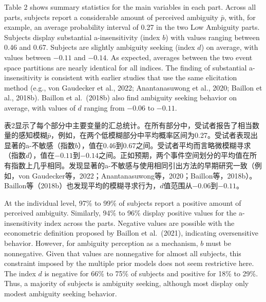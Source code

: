 \documentclass[12pt,a4paper]{article}
\newenvironment{original}
  {\par\medskip\noindent\color{black}\ignorespaces}
  {\par\medskip}
\newenvironment{translation}
  {\par\noindent\color{transblue}\ignorespaces}
  {\par\medskip\medskip}
\begin{document}
\begin{original}
Table 2 shows summary statistics for the main variables in each part. Across all parts, subjects report a considerable amount of perceived ambiguity $\bar{p}$, with, for example, an average probability interval of 0.27 in the two Low Ambiguity parts. Subjects display substantial a-insensitivity (index $b$) with values ranging between 0.46 and 0.67. Subjects are slightly ambiguity seeking (index $d$) on average, with values between $-0.11$ and $-0.14$. As expected, averages between the two event space partitions are nearly identical for all indices. The finding of substantial a-insensitivity is consistent with earlier studies that use the same elicitation method (e.g., von Gaudecker et al., 2022; Anantanasuwong et al., 2020; Baillon et al., 2018b). Baillon et al.\ (2018b) also find ambiguity seeking behavior on average, with values of $d$ ranging from $-0.06$ to $-0.11$.
\end{original}

\begin{translation}
表2显示了每个部分中主要变量的汇总统计。在所有部分中，受试者报告了相当数量的感知模糊$\bar{p}$，例如，在两个低模糊部分中平均概率区间为0.27。受试者表现出显著的a-不敏感（指数$b$），值在0.46到0.67之间。受试者平均而言略微模糊寻求（指数$d$），值在$-0.11$到$-0.14$之间。正如预期，两个事件空间划分的平均值在所有指数上几乎相同。发现显著的a-不敏感与使用相同引出方法的早期研究一致（例如，von Gaudecker等，2022；Anantanasuwong等，2020；Baillon等，2018b）。Baillon等（2018b）也发现平均的模糊寻求行为，$d$值范围从$-0.06$到$-0.11$。
\end{translation}

\begin{original}
At the individual level, 97\% to 99\% of subjects report a positive amount of perceived ambiguity. Similarly, 94\% to 96\% display positive values for the a-insensitivity index across the parts. Negative values are possible with the econometric definition proposed by Baillon et al.\ (2021), indicating oversensitive behavior. However, for ambiguity perception as a mechanism, $b$ must be nonnegative. Given that values are nonnegative for almost all subjects, this constraint imposed by the multiple prior models does not seem restrictive here. The index $d$ is negative for 66\% to 75\% of subjects and positive for 18\% to 29\%. Thus, a majority of subjects is ambiguity seeking, although most display only modest ambiguity seeking behavior.
\end{original}
\end{document}
